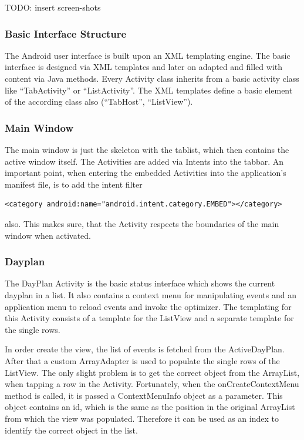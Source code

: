 TODO: insert screen-shots

\subsubsection{Basic Interface Structure} %
\label{ssub:Basic Interface Structure}
The Android user interface is built upon an XML templating engine.
The basic interface is designed via XML templates and later on adapted
and filled with content via Java methods. Every Activity class inherits
from a basic activity class like ``TabActivity'' or ``ListActivity''.
The XML templates define a basic element of the according class also
(``TabHost'', ``ListView'').


\subsubsection{Main Window} %
\label{ssub:MainWindow}

The main window is just the skeleton with the tablist, which then
contains the active window itself. The Activities are added
via Intents into the tabbar. An important point, when entering the embedded
Activities into the application's manifest file, is to add the intent filter
\begin{verbatim}
<category android:name="android.intent.category.EMBED"></category>
\end{verbatim}
also. This makes sure, that the Activity respects the boundaries of the
main window when activated.


\subsubsection{Dayplan} %
\label{ssub:Dayplan}
The DayPlan Activity is the basic status interface which shows the current
dayplan in a list. It also contains a context menu for manipulating events
and an application menu to reload events and invoke the optimizer. The
templating for this Activity consists of a template for the ListView and a
separate template for the single rows.

In order create the view, the list of events is fetched from the
ActiveDayPlan. After that a custom ArrayAdapter is used to populate the
single rows of the ListView.
The only slight problem is to get the correct object from the ArrayList,
when tapping a row in the Activity. Fortunately, when the onCreateContextMenu
method is called, it is passed a ContextMenuInfo object as a parameter. This
object contains an id, which is the same as the position in the original
ArrayList from which the view was populated. Therefore it can be used as an
index to identify the correct object in the list.

